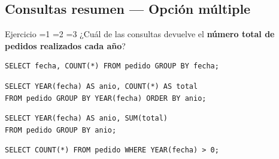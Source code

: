 \documentclass[12pt, a4paper]{article}
\newcommand{\estrella}{{\color{Goldenrod}\faStarSolid}}
\newcommand{\estrellavacia}{{\color{gray!45}\faStarSolid}}
\newcommand{\nivel}[1]{%
  \ifnum#1=1\estrella\estrellavacia\estrellavacia\fi
  \ifnum#1=2\estrella\estrella\estrellavacia\fi
  \ifnum#1=3\estrella\estrella\estrella\fi
}
\newcounter{numej}
\newcommand{\ej}{\stepcounter{numej}\thenumej}
\begin{document}
\subsection{Consultas resumen — Opción múltiple}

\begin{ejercicio}{Ejercicio \ej}{\nivel{2}}
¿Cuál de las consultas devuelve el \textbf{número total de pedidos
realizados cada año}?

\begin{opciones}
  \item
\begin{lstlisting}
SELECT fecha, COUNT(*) FROM pedido GROUP BY fecha;
\end{lstlisting}
  \item
\begin{lstlisting}
SELECT YEAR(fecha) AS anio, COUNT(*) AS total
FROM pedido GROUP BY YEAR(fecha) ORDER BY anio;
\end{lstlisting}
  \item
\begin{lstlisting}
SELECT YEAR(fecha) AS anio, SUM(total)
FROM pedido GROUP BY anio;
\end{lstlisting}
  \item
\begin{lstlisting}
SELECT COUNT(*) FROM pedido WHERE YEAR(fecha) > 0;
\end{lstlisting}
\end{opciones}
\end{ejercicio}
\end{document}
